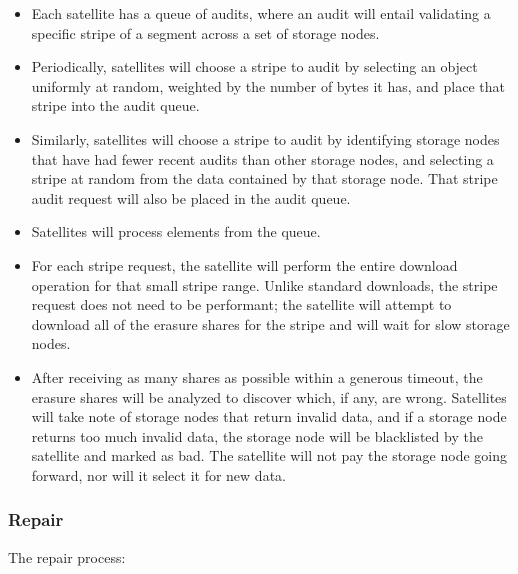 \documentclass[a4paper,10pt]{article} \usepackage[utf8]{inputenc}
\begin{document}
\begin{itemize}
\item Each satellite has a queue of audits, where an audit will entail
  validating a specific stripe of a segment across a set of storage nodes.
\item Periodically, satellites will choose a stripe to audit by selecting
  an object uniformly at random, weighted by the number of bytes it has, 
and place that stripe into the audit queue.
\item Similarly, satellites will choose a stripe to audit by identifying
  storage nodes that have had fewer recent audits than other storage nodes, and 
  selecting
  a stripe at random from the data contained by that storage node. That stripe 
  audit
  request will also be placed in the audit queue.
\item Satellites will process elements from the queue.
\item For each stripe request, the satellite will perform the entire download
  operation for that small stripe range. Unlike standard downloads, the stripe
  request does not need to be performant; the satellite will attempt to
  download all of the erasure shares for the stripe and will wait for slow
  storage nodes.
\item After receiving as many shares as possible within a generous timeout,
  the erasure shares will be analyzed to discover which, if any, are wrong.
  Satellites will take note of storage nodes that return invalid data, and if 
  a
  storage node returns too much invalid data, the storage node will be 
  blacklisted by the
  satellite and marked as bad. The satellite will not pay the storage 
  node going
  forward, nor will it select it for new data.
\end{itemize}

\subsubsection{Repair}

The repair process: 
\end{document}

